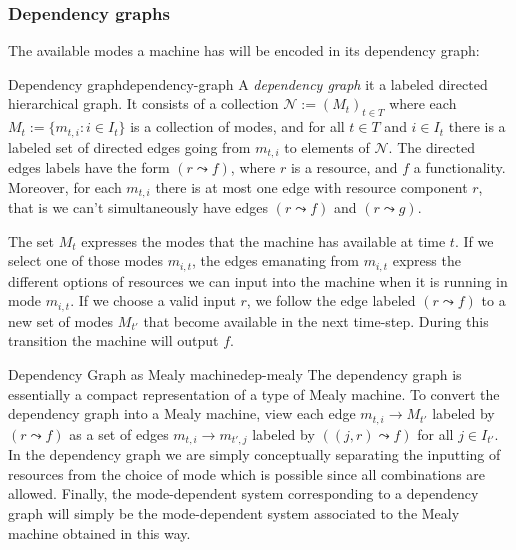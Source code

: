 \documentclass[12pt, a4paper]{article}
\theoremstyle{definition}
\theoremstyle{plain}
\theoremstyle{plain}
\theoremstyle{plain}
\theoremstyle{plain}
\theoremstyle{plain}
\theoremstyle{remark}
\theoremstyle{remark}
\newcommand{\mc}[1]{\mathcal{#1}}
\begin{document}
\subsubsection{Dependency graphs}
The available modes a machine has will be encoded in its dependency graph:
\begin{tcdefinition}{Dependency graph}{dependency-graph}
	A \emph{dependency graph} it a labeled directed hierarchical graph. It consists of a collection $\mc{N} := (M_t)_{t \in T}$ where each $M_t := \{ m_{t,i} : i \in I_t\}$ is a collection of modes, and for all $t \in T$ and $i \in I_t$ there is a labeled set of directed edges going from $m_{t,i}$ to elements of $\mc{N}$. The directed edges labels have the form $(r \leadsto f)$, where $r$ is a resource, and $f$ a functionality. Moreover, for each $m_{t,i}$ there is at most one edge with resource component $r$, that is we can't simultaneously have edges $(r \leadsto f)$ and $(r \leadsto g)$.
	
	The set $M_t$ expresses the modes that the machine has available at time $t$. If we select one of those modes $m_{i,t}$, the edges emanating from $m_{i,t}$ express the different options of resources we can input into the machine when it is running in mode $m_{i,t}$. If we choose a valid input $r$, we follow the edge labeled $(r \leadsto f)$ to a new set of modes $M_{t'}$ that become available in the next time-step. During this transition the machine will output $f$.
\end{tcdefinition}

\begin{tcexample}{}{}

\end{tcexample}

\begin{tcremark}{Dependency Graph as Mealy machine}{dep-mealy}
	The dependency graph is essentially a compact representation of a type of Mealy machine. To convert the dependency graph into a Mealy machine, view each edge $m_{t,i} \rightarrow M_{t'}$ labeled by $(r \leadsto f)$ as a set of edges $m_{t,i} \rightarrow m_{t',j}$ labeled by $((j,r) \leadsto f)$ for all $j \in I_{t'}$. In the dependency graph we are simply conceptually separating the inputting of resources from the choice of mode which is possible since all combinations are allowed. Finally, the mode-dependent system corresponding to a dependency graph will simply be the mode-dependent system associated to the Mealy machine obtained in this way.
\end{tcremark}
\end{document}
